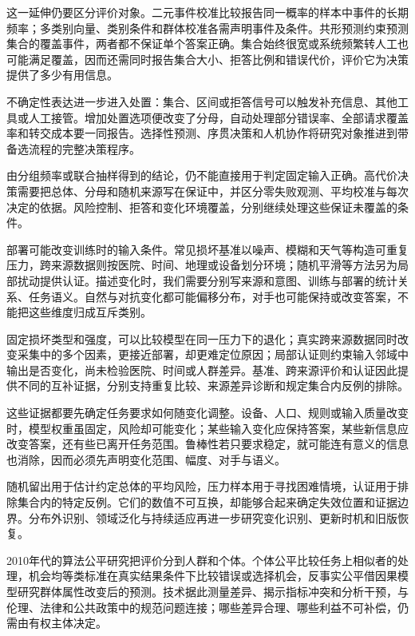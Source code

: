 这一延伸仍要区分评价对象。二元事件校准比较报告同一概率的样本中事件的长期频率；多类别向量、类别条件和群体校准各需声明事件及条件。共形预测约束预测集合的覆盖事件，两者都不保证单个答案正确。集合始终很宽或系统频繁转人工也可能满足覆盖，因而还需同时报告集合大小、拒答比例和错误代价，评价它为决策提供了多少有用信息。

不确定性表达进一步进入处置：集合、区间或拒答信号可以触发补充信息、其他工具或人工接管。增加处置选项便改变了分母，自动处理部分错误率、全部请求覆盖率和转交成本要一同报告。选择性预测、序贯决策和人机协作将研究对象推进到带备选流程的完整决策程序。

由分组频率或联合抽样得到的结论，仍不能直接用于判定固定输入正确。高代价决策需要把总体、分母和随机来源写在保证中，并区分零失败观测、平均校准与每次决定的依据。风险控制、拒答和变化环境覆盖，分别继续处理这些保证未覆盖的条件。

部署可能改变训练时的输入条件。常见损坏基准以噪声、模糊和天气等构造可重复压力，跨来源数据则按医院、时间、地理或设备划分环境；随机平滑等方法另为局部扰动提供认证。描述变化时，我们需要分别写来源和意图、训练与部署的统计关系、任务语义。自然与对抗变化都可能偏移分布，对手也可能保持或改变答案，不能把这些维度归成互斥类别。

固定损坏类型和强度，可以比较模型在同一压力下的退化；真实跨来源数据同时改变采集中的多个因素，更接近部署，却更难定位原因；局部认证则约束输入邻域中输出是否变化，尚未检验医院、时间或人群差异。基准、跨来源评价和认证因此提供不同的互补证据，分别支持重复比较、来源差异诊断和规定集合内反例的排除。

这些证据都要先确定任务要求如何随变化调整。设备、人口、规则或输入质量改变时，模型权重虽固定，风险却可能变化；某些输入变化应保持答案，某些新信息应改变答案，还有些已离开任务范围。鲁棒性若只要求稳定，就可能连有意义的信息也消除，因而必须先声明变化范围、幅度、对手与语义。

随机留出用于估计约定总体的平均风险，压力样本用于寻找困难情境，认证用于排除集合内的特定反例。它们的数值不可互换，却能够合起来确定失效位置和证据边界。分布外识别、领域泛化与持续适应再进一步研究变化识别、更新时机和旧版恢复。

2010年代的算法公平研究把评价分到人群和个体。个体公平比较任务上相似者的处理，机会均等类标准在真实结果条件下比较错误或选择机会，反事实公平借因果模型研究群体属性改变后的预测。技术据此测量差异、揭示指标冲突和分析干预，与伦理、法律和公共政策中的规范问题连接；哪些差异合理、哪些利益不可补偿，仍需由有权主体决定。

